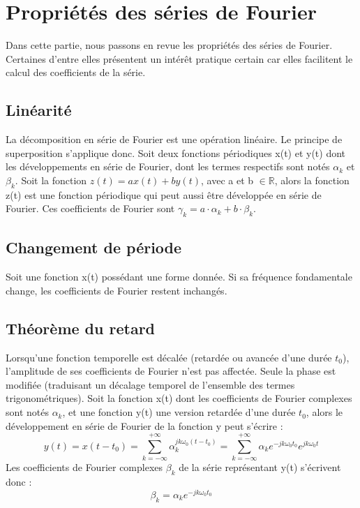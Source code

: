 	
	
	\section{Propriétés des séries de Fourier}
	Dans cette partie, nous passons en revue les propriétés des séries de Fourier. Certaines d'entre elles présentent un intérêt pratique certain car elles facilitent le calcul des coefficients de la série.
	
	\subsection{Linéarité}
	La décomposition en série de Fourier est une opération linéaire. Le principe de superposition s'applique donc. Soit deux fonctions périodiques x(t) et y(t) dont les développements en série de Fourier, dont les termes respectifs sont notés $\alpha_{k}$ et $\beta_{k}$. Soit la fonction $z(t)=ax(t)+by(t)$, avec a et b $\in \mathbb{R}$, alors la fonction z(t) est une fonction périodique qui peut aussi être développée en série de Fourier. Ces coefficients de Fourier sont $\gamma_{k}=a\cdot \alpha_{k}+b \cdot \beta_{k}$.
	
	\subsection{Changement de période}
	Soit une fonction x(t) possédant une forme donnée. Si sa fréquence fondamentale change, les coefficients de Fourier restent inchangés.
	
	\subsection{Théorème du retard}
	Lorsqu'une fonction temporelle est décalée (retardée ou avancée d'une durée $t_{0}$), l'amplitude de ses coefficients de Fourier n'est pas affectée. Seule la phase est modifiée (traduisant un décalage temporel de l'ensemble des termes trigonométriques). Soit la fonction x(t) dont les coefficients de Fourier complexes sont notés $\alpha_{k}$, et une fonction y(t) une version retardée d'une durée $t_{0}$, alors le développement en série de Fourier de la fonction y peut s'écrire :
	\begin{equation*}
	y(t)=x(t-t_0)=\sum_{k=-\infty}^{+\infty}\alpha_{k}^{jk\omega_{0}(t-t_0)}=\sum_{k=-\infty}^{+\infty}\alpha_{k}e^{-jk\omega_{0}t_0}e^{jk\omega_{0}t}
	\end{equation*}
	Les coefficients de Fourier complexes $\beta_{k}$ de la série représentant y(t) s'écrivent donc :
	\begin{equation}\label{Theoreme_retadr_serie_Fourier}
	\beta_{k}=\alpha_{k}e^{-jk\omega_{0}t_0}
	\end{equation}
	
